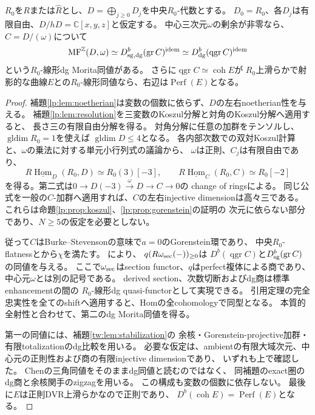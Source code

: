 \begin{lemma}[正則DVR上の三変数MF比較]
\label{gre:lem:elliptic-mf}
$R_0$を$R$または$\widehat R$とし、$D=\bigoplus_{j\ge0}D_j$を中央$R_0$-代数とする。
$D_0=R_0$、各$D_j$は有限自由、$D/hD=\mathbb C[x,y,z]$と仮定する。
中心三次元$\omega$の剰余が非零なら、$C=D/(\omega)$について
\begin{equation}\label{gre:eq:elliptic-mf}
 \operatorname{MF}^{\mathbb Z}(D,\omega)
 \simeq D^b_{\rm sg,dg}(\operatorname{gr}C)^{\rm idem}
 \simeq D^b_{\rm dg}(\operatorname{qgr}C)^{\rm idem}
\end{equation}
という$R_0$-線形dg Morita同値がある。
さらに$\operatorname{qgr}C\simeq\operatorname{coh}E$が
$R_0$上滑らかで射影的な曲線$E$との$R_0$-線形同値なら、右辺は$\operatorname{Perf}(E)$となる。
\end{lemma}
\begin{proof}
補題\ref{lp:lem:noetherian}は変数の個数に依らず、$D$の左右noetherian性を与える。
補題\ref{lp:lem:resolution}を三変数のKoszul分解と対角のKoszul分解へ適用すると、
長さ三の有限自由分解を得る。
対角分解に任意の加群をテンソルし、$\operatorname{gldim}R_0=1$を使えば
$\operatorname{gldim}D\le4$となる。
各内部次数での双対Koszul計算と、$\omega$の乗法に対する単元小行列式の議論から、
$\omega$は正則、$C_j$は有限自由であり、
\begin{equation}\label{gre:eq:elliptic-gorenstein}
 R\underline{\operatorname{Hom}}_D(R_0,D)\simeq R_0(3)[-3],
 \qquad
 R\underline{\operatorname{Hom}}_C(R_0,C)\simeq R_0[-2]
\end{equation}
を得る。第二式は$0\to D(-3)\xrightarrow{\omega}D\to C\to0$の
change of ringsによる。
同じ公式を一般の$C$-加群へ適用すれば、$C$の左右injective dimensionは高々三である。
これらは命題\ref{lp:prop:koszul}、\ref{lp:prop:gorenstein}の証明の
次元に依らない部分であり、$N\ge5$の仮定を必要としない。

従って$C$はBurke--Stevensonの意味で$a=0$のGorenstein環であり、
中央$R_0$-flatnessと\cite[Lemma~6.2]{LP-BS}から$\chi$を満たす。
\cite[Theorem~6.4(3)]{LP-BS}により、
$q(R\omega_{\rm sec}(-))_{\ge0}$は
$D^b(\operatorname{qgr}C)$と$D^b_{\rm sg}(\operatorname{gr}C)$の同値を与える。
ここで$\omega_{\rm sec}$はsection functor、$q$はperfect複体による商であり、
中心元$\omega$とは別の記号である。
derived section、次数切断およびdg商は標準enhancementの間の
$R_0$-線形dg quasi-functorとして実現できる。
引用定理の完全忠実性を全てのshiftへ適用すると、Homの全cohomologyで同型となる。
本質的全射性と合わせて、第二のdg Morita同値を得る。

第一の同値には、補題\ref{tw:lem:stabilization}の
余核・Gorenstein-projective加群・有限totalizationのdg比較を用いる。
必要な仮定は、ambientの有限大域次元、中心元の正則性および商の有限injective dimensionであり、
いずれも上で確認した。
Chen\cite[Theorem~7.2]{AMChen}の三角同値をそのままdg同値と読むのではなく、
同補題のexact圏のdg商と余核関手のzigzagを用いる。
この構成も変数の個数に依存しない。
最後に$E$は正則DVR上滑らかなので正則であり、
$D^b(\operatorname{coh}E)=\operatorname{Perf}(E)$となる。
\end{proof}

